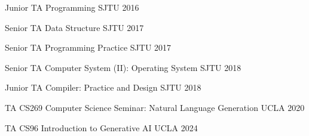 



\begin{cvhonors}

  \cvhonor
    {Junior TA} %
    {Programming} %
    {SJTU} %
    {2016} %

  \cvhonor
    {Senior TA} %
    {Data Structure} %
    {SJTU} %
    {2017} %

  \cvhonor
    {Senior TA} %
    {Programming Practice} %
    {SJTU} %
    {2017} %

  \cvhonor
    {Senior TA} %
    {Computer System (II): Operating System} %
    {SJTU} %
    {2018} %

  \cvhonor
    {Junior TA} %
    {Compiler: Practice and Design} %
    {SJTU} %
    {2018} %

  \cvhonor
    {TA} %
    {CS269 Computer Science Seminar: Natural Language Generation} %
    {UCLA} %
    {2020} %

  \cvhonor
    {TA} %
    {CS96 Introduction to Generative AI} %
    {UCLA} %
    {2024} %




\end{cvhonors}
